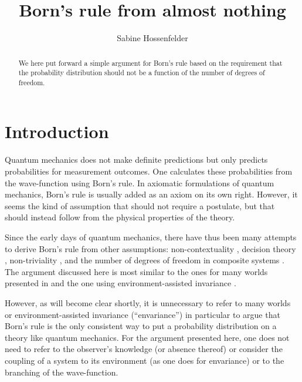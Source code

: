 \documentclass[12pt]{article}
\begin{document}
\title{Born's rule from almost nothing}
\author{Sabine Hossenfelder}
\date{}
\maketitle
\vspace*{-1cm}

\begin{abstract}
We here put forward a simple argument for Born's rule based on the requirement that the probability distribution should not be a function of the number of degrees of freedom.
\end{abstract} 

\section{Introduction}

Quantum mechanics does not make definite predictions but only predicts probabilities for measurement outcomes. One calculates these probabilities
from the wave-function using Born's rule. In axiomatic formulations of quantum mechanics, Born's rule is usually added as an
axiom on its own right. However, it seems the kind of assumption that should not require a postulate, but that should instead follow from
the physical properties of the theory. 

Since the early days of quantum mechanics, there have thus been many attempts to derive 
Born's rule from other assumptions: non-contextuality \cite{Gleason}, decision theory \cite{Deutsch}, non-triviality \cite{Aaronson}, and the number of degrees of freedom in composite systems \cite{Hardy,Masanes:2010tt,Brukner}. The argument discussed here is most similar to the ones for many worlds presented in \cite{Vaidman, Carroll:2014mea} and the one using environment-assisted invariance \cite{Zurek}. 

However, as will become clear shortly, it is unnecessary to refer to many worlds or environment-assisted invariance (“envariance”) in particular to argue that Born’s rule is the only consistent way to put a probability distribution on a theory like quantum mechanics. For the argument presented here, one does not need to refer to the observer’s knowledge (or absence thereof) or consider the coupling of a system to its environment (as one does for envariance) or to the branching of the wave-function.
\end{document}
